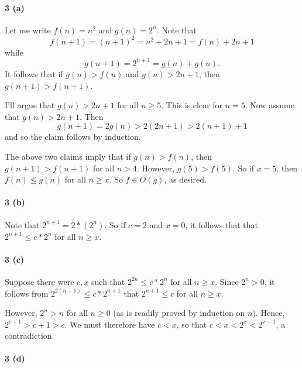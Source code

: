 \documentclass[
]{article}
\begin{document}
\hypertarget{a-2}{%
\paragraph{3 (a)}\label{a-2}}

Let me write \(f(n) = n^2\) and \(g(n) = 2^n\). Note that
\begin{equation*}
f(n+1) = (n+1)^2 = n^2 + 2n + 1 = f(n) + 2n + 1  
\end{equation*} while \begin{equation*}
g(n+1)=2^{n+1}=g(n)+g(n).
\end{equation*} It follows that if \(g(n)>f(n)\) and \(g(n)>2n+1\), then
\(g(n+1)>f(n+1)\).

I'll argue that \(g(n) > 2n+1\) for all \(n\geq 5\). This is clear for
\(n=5\). Now assume that \(g(n)>2n+1\). Then \begin{equation*}
g(n+1) = 2g(n) > 2(2n + 1) > 2(n+1) + 1  
\end{equation*} and so the claim follows by induction.

The above two claims imply that if \(g(n)>f(n)\), then \(g(n+1)>f(n+1)\)
for all \(n>4\). However, \(g(5)>f(5)\). So if \(x=5\), then
\(f(n)\leq g(n)\) for all \(n\geq x\). So \(f\in O(g)\), as desired.

\hypertarget{b-2}{%
\paragraph{3 (b)}\label{b-2}}

Note that \(2^{n+1} = 2*(2^n)\). So if \(c=2\) and \(x=0\), it follows
that that \(2^{n+1}\leq c*2^n\) for all \(n\geq x\).

\hypertarget{c-1}{%
\paragraph{3 (c)}\label{c-1}}

Suppose there were \(c,x\) such that \(2^{2n} \leq c*2^n\) for all
\(n\geq x\). Since \(2^n>0\), it follows from
\(2^{2(n+1)} \leq c * 2^{n+1}\) that \(2^{n+1} \leq c\) for all
\(n\geq x\).

However, \(2^n>n\) for all \(n\geq0\) (as is readily proved by induction
on \(n\)). Hence, \(2^{c+1}> c+1 > c\). We must therefore have \(c<x\),
so that \(c < x < 2^x < 2^{x+1}\), a contradiction.

\hypertarget{d-1}{%
\paragraph{3 (d)}\label{d-1}}
\end{document}
